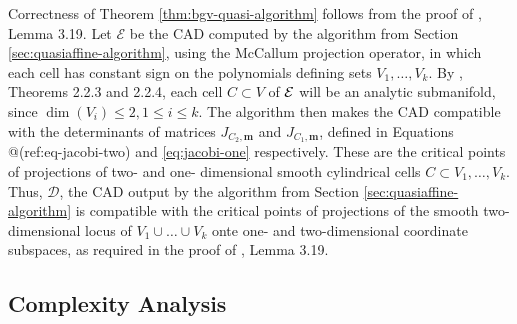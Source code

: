 \documentclass[
]{book}
\theoremstyle{definition}
\theoremstyle{definition}
\theoremstyle{definition}
\theoremstyle{definition}
\theoremstyle{remark}
\begin{document}
Correctness of Theorem \ref{thm:bgv-quasi-algorithm} follows from the proof of \citet{bgv15}, Lemma 3.19. Let \(\mathcal{E}\) be the CAD computed by the algorithm from Section \ref{sec:quasiaffine-algorithm}, using the McCallum projection operator, in which each cell has constant sign on the polynomials defining sets \(V_1,\ldots,V_k\).
By \citet{mccallum1988}, Theorems 2.2.3 and 2.2.4, each cell \(C \subset V\) of \(\cal E\) will be an analytic submanifold, since \(\dim(V_i) \le 2, 1\le i \le k\).
The algorithm then makes the CAD compatible with the determinants of matrices \(J_{C_2,\mathbf{m}}\) and \(J_{C_1,\mathbf{m}}\), defined in Equations @(ref:eq-jacobi-two) and \eqref{eq:jacobi-one} respectively. These are the critical points of projections of two- and one- dimensional smooth cylindrical cells \(C \subset V_1,\ldots,V_k\). Thus, \(\mathcal{D}\), the CAD output by the algorithm from Section \ref{sec:quasiaffine-algorithm} is compatible with the critical points of projections of the smooth two-dimensional locus of \(V_1\cup \ldots \cup V_k\) onte one- and two-dimensional coordinate subspaces, as required in the proof of \citet{bgv15}, Lemma 3.19.

\hypertarget{complexity-analysis}{%
\subsection{Complexity Analysis}\label{complexity-analysis}}
\end{document}

